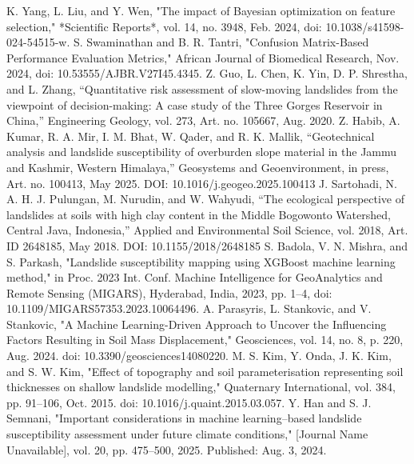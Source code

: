 \documentclass[conference]{IEEEtran}
\begin{document}
\begin{thebibliography}{00}
 K. Yang, L. Liu, and Y. Wen, "The impact of Bayesian optimization on feature selection," *Scientific Reports*, vol. 14, no. 3948, Feb. 2024, doi: 10.1038/s41598-024-54515-w.
 S. Swaminathan and B. R. Tantri, "Confusion Matrix-Based Performance Evaluation Metrics," African Journal of Biomedical Research, Nov. 2024, doi: 10.53555/AJBR.V27I45.4345.
 Z. Guo, L. Chen, K. Yin, D. P. Shrestha, and L. Zhang, “Quantitative risk assessment of slow-moving landslides from the viewpoint of decision-making: A case study of the Three Gorges Reservoir in China,” Engineering Geology, vol. 273, Art. no. 105667, Aug. 2020.
 Z. Habib, A. Kumar, R. A. Mir, I. M. Bhat, W. Qader, and R. K. Mallik, “Geotechnical analysis and landslide susceptibility of overburden slope material in the Jammu and Kashmir, Western Himalaya,” Geosystems and Geoenvironment, in press, Art. no. 100413, May 2025. DOI: 10.1016/j.geogeo.2025.100413
 J. Sartohadi, N. A. H. J. Pulungan, M. Nurudin, and W. Wahyudi, “The ecological perspective of landslides at soils with high clay content in the Middle Bogowonto Watershed, Central Java, Indonesia,” Applied and Environmental Soil Science, vol. 2018, Art. ID 2648185, May 2018. DOI: 10.1155/2018/2648185
 S. Badola, V. N. Mishra, and S. Parkash, "Landslide susceptibility mapping using XGBoost machine learning method," in Proc. 2023 Int. Conf. Machine Intelligence for GeoAnalytics and Remote Sensing (MIGARS), Hyderabad, India, 2023, pp. 1–4, doi: 10.1109/MIGARS57353.2023.10064496.
 A. Parasyris, L. Stankovic, and V. Stankovic, "A Machine Learning-Driven Approach to Uncover the Influencing Factors Resulting in Soil Mass Displacement," Geosciences, vol. 14, no. 8, p. 220, Aug. 2024. doi: 10.3390/geosciences14080220.
 M. S. Kim, Y. Onda, J. K. Kim, and S. W. Kim, "Effect of topography and soil parameterisation representing soil thicknesses on shallow landslide modelling," Quaternary International, vol. 384, pp. 91–106, Oct. 2015. doi: 10.1016/j.quaint.2015.03.057.
 Y. Han and S. J. Semnani, "Important considerations in machine learning–based landslide susceptibility assessment under future climate conditions," [Journal Name Unavailable], vol. 20, pp. 475–500, 2025. Published: Aug. 3, 2024.
\end{thebibliography}
\end{document}
